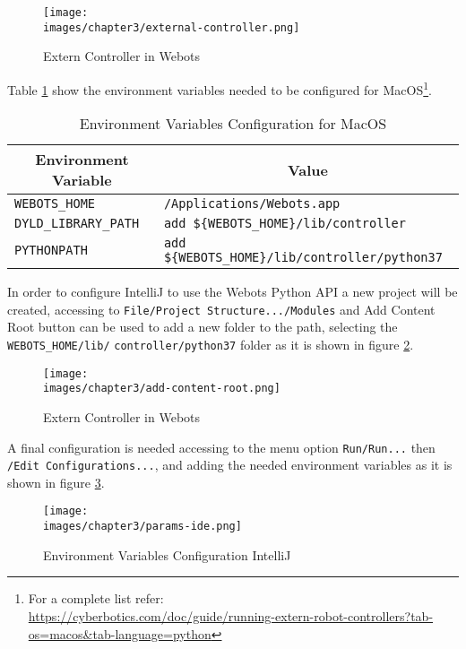 \begin{figure}[ht]
	\texttt{[image: \\images/chapter3/external-controller.png]}
	\caption{Extern Controller in Webots}
	\label{fig-ch-3:external-controller}
\end{figure}

Table \ref{tab:ch-3:env-variables} show the environment variables needed to be configured for MacOS\footnote{For a complete list refer: \\ \url{https://cyberbotics.com/doc/guide/running-extern-robot-controllers?tab-os=macos&tab-language=python}}.

\begin{table}[]
\begin{tabular}{|l|l|}
\hline
\multicolumn{1}{|c|}{\textbf{Environment Variable}} & \multicolumn{1}{c|}{\textbf{Value}}            \\ \hline
\verb|WEBOTS_HOME|                                        & \verb|/Applications/Webots.app|                       \\ \hline
\verb|DYLD_LIBRARY_PATH|                                 & \verb|add ${WEBOTS_HOME}/lib/controller|          \\ \hline
\verb|PYTHONPATH|                                          & \verb|add ${WEBOTS_HOME}/lib/controller/python37| \\ \hline
\end{tabular}
\caption {Environment Variables Configuration for MacOS}
\label{tab:ch-3:env-variables}
\end{table}

In order to configure IntelliJ to use the Webots Python API a new project will be created, accessing to \verb|File/Project Structure.../Modules| and Add Content Root button can be used to add a new folder to the path, selecting the \verb|WEBOTS_HOME/lib/| \verb|controller/python37| folder as it is shown in figure \ref{fig-ch-3:add-content-root}.

\begin{figure}[ht]
	\texttt{[image: \\images/chapter3/add-content-root.png]}
	\caption{Extern Controller in Webots}
	\label{fig-ch-3:add-content-root}
\end{figure}

A final configuration is needed accessing to the menu option \verb|Run/Run...| then \verb|/Edit Configurations...|, and adding the needed environment variables as it is shown in figure \ref{fig-ch-3:params-ide}.

\begin{figure}[ht]
	\texttt{[image: \\images/chapter3/params-ide.png]}
	\caption{Environment Variables Configuration IntelliJ}
	\label{fig-ch-3:params-ide}
\end{figure}

